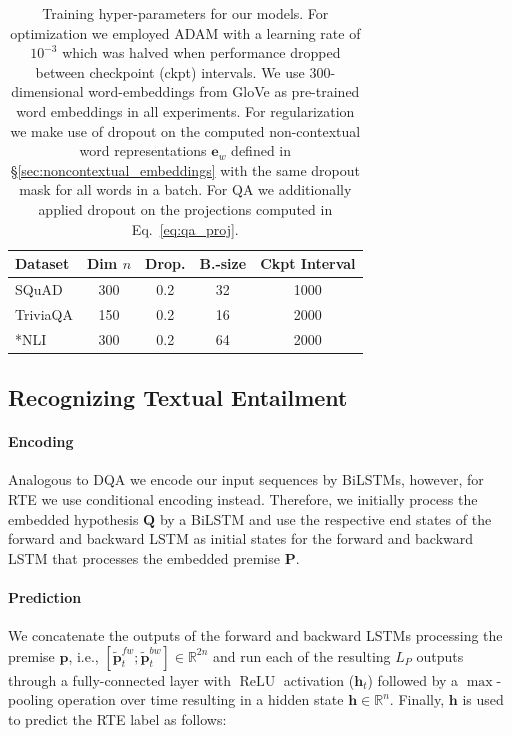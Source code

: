 \documentclass[11pt,a4paper]{article}
\begin{document}
\begin{table}[t]
    \small
    \begin{tabular}{l c c c c}
        \toprule
        \textbf{Dataset} & \textbf{Dim} $n$ & \textbf{Drop.} & \textbf{B.-size} & \textbf{Ckpt Interval} \\ \midrule
        SQuAD & 300 & 0.2 & 32 & 1000 \\
        TriviaQA & 150 & 0.2 & 16 & 2000 \\
        *NLI & 300 & 0.2 & 64 & 2000 \\
        \bottomrule
    \end{tabular}
    \caption{Training hyper-parameters for our models. For optimization we employed ADAM with a learning rate of $10^{-3}$ which was halved when performance dropped between checkpoint (ckpt) intervals. We use $300$-dimensional word-embeddings from GloVe \citep{Pennington2014} as pre-trained word embeddings in all experiments. For regularization we make use of dropout on the computed non-contextual word representations $\mathbf{e}_w$ defined in \S\ref{sec:noncontextual_embeddings} with the same dropout mask for all words in a batch. For QA we additionally applied dropout on the projections computed in Eq.~\ref{eq:qa_proj}.
}\label{tab:training_details}
\end{table}


\subsection{Recognizing Textual Entailment}\label{sec:rte_impl}

\paragraph{Encoding} Analogous to DQA we encode our input sequences by BiLSTMs, however, for RTE we use conditional encoding \citep{Rocktschel2015} instead. Therefore, we initially process the embedded hypothesis $\mathbf{Q}$ by a BiLSTM and use the respective end states of the forward and backward LSTM as initial states for the forward and backward LSTM that processes the embedded premise $\mathbf{P}$. 

\paragraph{Prediction} We concatenate the outputs of the forward and backward LSTMs processing the premise $\boldsymbol{p}$, i.e., $\left[\tilde{\mathbf{p}}^{fw}_t; \tilde{\mathbf{p}}^{bw}_t \right] \in \mathbb{R}^{2n}$ and run each of the resulting $L_P$ outputs through a fully-connected layer with $\operatorname{ReLU}$ activation ($\mathbf{h}_t$) followed by a $\max$-pooling operation over time resulting in a hidden state $\mathbf{h} \in \mathbb{R}^{n}$. Finally, $\mathbf{h}$ is used to predict the RTE label as follows:
\end{document}
